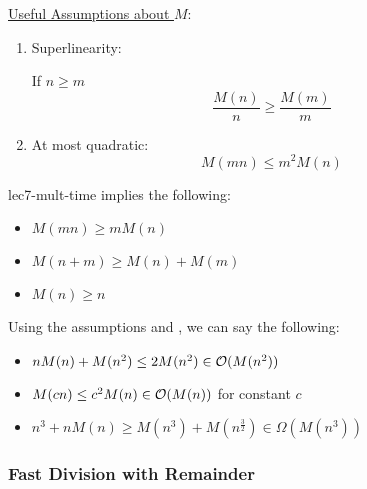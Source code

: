 \ul{Useful Assumptions about $M$}:
\begin{enumerate}
    \item Superlinearity: 
    
    If $n \geq m$ 
    \begin{equation}\label{eq:lec7-mult-time-superlinearity}
        \frac{M(n)}{n} \geq \frac{M(m)}{m}
    \end{equation}
    
    \item At most quadratic:
    \begin{equation}\label{eq:lec7-mult-time-quadratic}
        M(mn) \leq m^2M(n)
    \end{equation}
\end{enumerate}

\begin{proposition}{}{lec7-mult-time}
     implies the following:
    \begin{itemize}
        \item $M(mn) \geq mM(n)$
        \item $M(n + m) \geq M(n) + M(m)$
        \item $M(n) \geq n$
    \end{itemize}
\end{proposition}

\begin{example}{}{}
    Using the assumptions and , we can say the following:
    \begin{itemize}
        \item $nM(n) + M(n^2) \leq 2M(n^2) \in \operatorname{\mathcal{O}}(M(n^2))$
        \item $M(cn) \leq c^2M(n) \in \operatorname{\mathcal{O}}(M(n))$ for constant $c$ 
        \item $n^3 + nM(n) \geq M(n^3) + M(n^{\frac{3}{2}}) \in \Omega(M(n^3))$
    \end{itemize}
\end{example}

\subsubsection{Fast Division with Remainder}